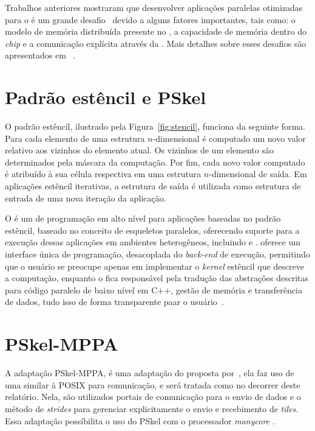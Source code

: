 Trabalhos anteriores mostraram que desenvolver aplicações paralelas otimizadas
para o \mppa é um grande desafio~\cite{Castro-IA3-JPDC:2014} devido a alguns
fatores importantes, tais como: o modelo de memória distribuída presente no
\mppa, a capacidade de memória dentro do \textit{chip} e a comunicação explícita
através da \noc. Mais detalhes sobre esses desafios são apresentados em
~\cite{Castro-Podesta-ERAD:2017}.

\section{Padrão estêncil e PSkel}
\label{subsec:pskel}

O padrão estêncil, ilustrado pela Figura~\ref{fig:stencil}, funciona da
seguinte forma. Para cada elemento de
uma estrutura $n$-dimensional é computado um novo valor relativo aos vizinhos do
elemento atual. Os vizinhos de um elemento são determinados pela máscara da
computação. Por fim, cada novo valor computado é atribuído à sua célula
respectiva em uma estrutura $n$-dimensional de saída. Em aplicações
estêncil iterativas, a estrutura de saída é utilizada como
estrutura de entrada de uma nova iteração da aplicação.

O \pskel é um \fw de programação em alto nível para aplicações baseadas no
padrão estêncil, baseado no conceito de esqueletos paralelos, oferecendo suporte para a execução dessas aplicações em
ambientes heterogêneos, incluindo \cpu e \gpu. \pskel oferece um interface única de programação, desacoplada do \textit{back-end} de execução, permitindo que o usuário se preocupe apenas em implementar o \textit{kernel} estêncil que descreve a computação, enquanto o \fw fica responsável pela tradução das abstrações descritas para código paralelo de baixo nível em C++, gestão de memória e transferência de dados, tudo isso de forma transparente paar o usuário~\cite{pereira15}.


\section{PSkel-MPPA}
\label{subsec:pskel-mppa}

A adaptação PSkel-MPPA, é uma adaptação do \pskel proposta por~\cite{PodestaJr.2017}, ela faz uso de uma \api similar à POSIX \ipc para comunicação, e será tratada como \ipc no decorrer deste relatório. Nela, são utilizados portais de comunicação para o envio de dados e o método de \textit{strides}  para gerenciar explicitamente o envio e recebimento de \textit{tiles}. Essa adaptação possíbilita o uso do \fw PSkel com o processador \textit{manycore} \mppa.

